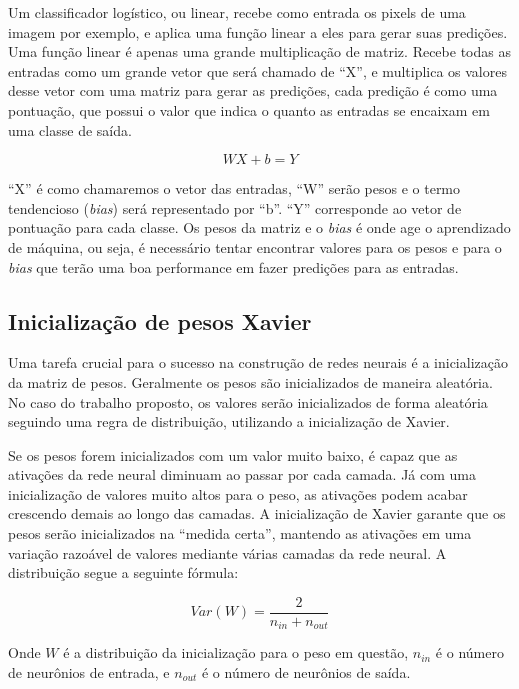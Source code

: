 Um classificador logístico, ou linear, recebe como entrada os pixels
de uma imagem por exemplo, e aplica uma função linear a eles para
gerar suas predições. Uma função linear é apenas uma grande
multiplicação de matriz. Recebe todas as entradas como um grande vetor
que será chamado de ``X'', e multiplica os valores desse vetor com uma
matriz para gerar as predições, cada predição é como uma pontuação,
que possui o valor que indica o quanto as entradas se encaixam em uma
classe de saída.

\begin{equation}
   WX + b = Y
\end{equation}

``X'' é como chamaremos o vetor das entradas, ``W'' serão pesos e
o termo tendencioso (\textit{bias}) será representado por ``b''. ``Y''
corresponde ao vetor de pontuação para cada classe. Os pesos da
matriz e o \textit{bias} é onde age o aprendizado de máquina, ou seja,
é necessário tentar encontrar valores para os pesos e para o
\textit{bias} que terão uma boa performance em fazer predições para as
entradas.

\subsection{Inicialização de pesos Xavier}

Uma tarefa crucial para o sucesso na construção de redes neurais é a
inicialização da matriz de pesos. Geralmente os pesos são
inicializados de maneira aleatória. No caso do trabalho proposto,
os valores serão inicializados de forma aleatória seguindo uma regra
de distribuição, utilizando a inicialização de Xavier\cite{Glorot}.

Se os pesos forem inicializados com um valor muito baixo, é capaz que
as ativações da rede neural diminuam ao passar por cada camada. Já com
uma inicialização de valores muito altos para o peso, as ativações
podem acabar crescendo demais ao longo das camadas. A inicialização de
Xavier garante que os pesos serão inicializados na ``medida certa'',
mantendo as ativações em uma variação razoável de valores mediante
várias camadas da rede neural. A distribuição segue a seguinte
fórmula:

\begin{equation}
  Var(W) = \frac{2}{n_{in}+n_{out}}
\end{equation}

Onde $W$ é a distribuição da inicialização para o peso em questão,
$n_{in}$ é o número de neurônios de entrada, e $n_{out}$ é o número de
neurônios de saída.

